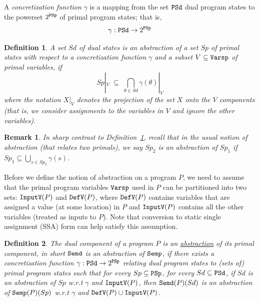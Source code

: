 \documentclass[preprint]{sig-alternate-05-2015}
\newtheorem{definition}{Definition}
\newtheorem{remark}{Remark}
\def\Vp{{\tt{Varsp}}}
\def\psp{{\tt{PSp}}}
\def\psd{{\tt{PSd}}}
\def\semp{{\tt{Semp}}}
\def\semd{{\tt{Semd}}}
\def\UndefV{{\tt{InputV}}}
\def\DefV{{\tt{DefV}}}
\begin{document}
A {\em{concretization function}} $\gamma$ is a mapping from 
the set $\psd$ dual program states to the powerset $2^\psp$ of
primal program states; that is,
$$ \gamma: \psd \rightarrow 2^{\psp} $$

\begin{definition}\label{def:abs0}
A set $Sd$ of dual states is an {\em{abstraction}} of 
a set $Sp$ of primal states with respect to a concretization
function $\gamma$ and a subset $V\subseteq\Vp$ of primal variables, 
if
$$
  Sp|_V \;\subseteq\; \bigcap_{\theta\in Sd}\gamma(\theta)|_V 
$$
where the notation $X|_V$ denotes the projection of the set $X$
onto the $V$ components (that is, we consider assignments to the
variables in $V$ and ignore the other variables).
\end{definition}

\begin{remark}
  In sharp contrast to Definition~\ref{def:abs0},
  recall that in the usual notion of abstraction (that relates two primals),
  we say $Sp_2$ is an abstraction of $Sp_1$ if 
  $Sp_1 \subseteq \bigcup_{s\in Sp_2}\gamma(s)$.
\end{remark}

Before we define the notion of abstraction on a program $P$,
we need to assume that 
the primal program variables $\Vp$ used in $P$
can be partitioned into two sets: $\UndefV(P)$ and $\DefV(P)$,
where $\DefV(P)$ contains variables that are
assigned a value (at some location) in $P$ 
and $\UndefV(P)$ contains all the other
variables (treated as inputs to $P$).
Note that conversion to
static single assignment (SSA) form can help
satisfy this assumption.

\begin{definition}\label{def:abs}
The dual component of a program $P$
is an {\underline{abstraction}} of its primal component,
in short {{$\semd$ is an abstraction of $\semp$}},
if there exists a {\em{concretization}} function
$
 \gamma: \psd \rightarrow 2^{\psp}
$
relating dual program states to (sets of) primal program states such
that
for every $Sp\subseteq \psp$, 
for every $Sd\subseteq \psd$,
if $Sd$ is an abstraction of $Sp$ w.r.t $\gamma$ and $\UndefV(P)$,
then
$\semd(P)(Sd)$ is an abstraction of $\semp(P)(Sp)$ w.r.t $\gamma$ and
$\DefV(P)\cup\UndefV(P)$.
\end{definition}
\end{document}
